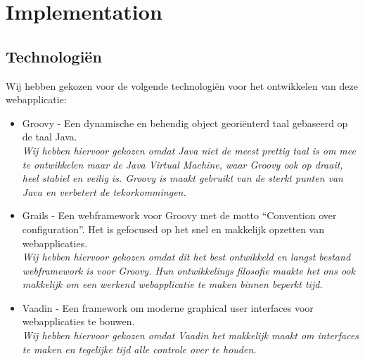 \chapter{Implementation}

\section{Technologi\"en}

Wij hebben gekozen voor de volgende technologi\"en voor het ontwikkelen van deze webapplicatie:
\begin{itemize}
\item Groovy - Een dynamische en behendig object geori\"enterd taal gebaseerd op de taal Java.
\vspace{2mm} \\
\textit{Wij hebben hiervoor gekozen omdat Java niet de meest prettig taal is om mee te ontwikkelen maar de Java Virtual Machine, waar Groovy ook op draait, heel stabiel en veilig is. Groovy is maakt gebruikt van de sterkt punten van Java en verbetert de tekorkommingen.}

\item Grails - Een webframework voor Groovy met de motto ``Convention over configuration''. Het is gefocused op het snel en makkelijk opzetten van webapplicaties.
\vspace{2mm} \\
\textit{Wij hebben hiervoor gekozen omdat dit het best ontwikkeld en langst bestand webframework is voor Groovy. Hun ontwikkelings filosofie maakte het ons ook makkelijk om een werkend webapplicatie te maken binnen beperkt tijd.}

\item Vaadin - Een framework om moderne graphical user interfaces voor webapplicaties te bouwen.
\vspace{2mm} \\
\textit{Wij hebben hiervoor gekozen omdat Vaadin het makkelijk maakt om interfaces te maken en tegelijke tijd alle controle over te houden.}
\end{itemize}